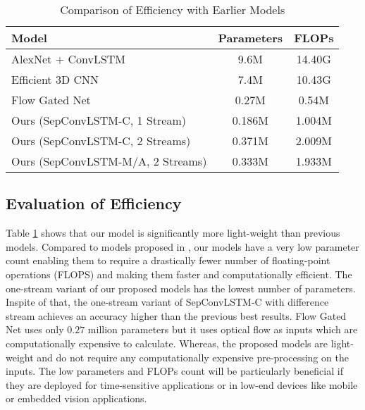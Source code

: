 \documentclass[conference]{IEEEtran}
\begin{document}
\begin{table}[t]
\caption{Comparison of Efficiency with Earlier Models}
\begin{center}
\begin{tabular}{lcc}
\hline
\textbf{Model}                & \textbf{Parameters} & \textbf{FLOPs} \\ \hline
AlexNet + ConvLSTM \cite{sudhakaran2017learning}                       & 9.6M           & 14.40G     \\
Efficient 3D CNN \cite{li2019efficient}               & 7.4M           & 10.43G    \\
Flow Gated Net \cite{cheng2019rwf}                & 0.27M           & 0.54M   \\
Ours (SepConvLSTM-C, 1 Stream)  & 0.186M        &  1.004M         \\
Ours (SepConvLSTM-C, 2 Streams) & 0.371M     &  2.009M              \\ 
Ours (SepConvLSTM-M/A, 2 Streams) & 0.333M     &  1.933M               \\ \hline
\end{tabular}
\end{center}
\label{table:efficiency}
\end{table}



\subsection{Evaluation of Efficiency}

Table \ref{table:efficiency} shows that our model is significantly more light-weight than previous models. Compared to models proposed in \cite{sudhakaran2017learning} \cite{li2019efficient}, our models have a very low parameter count enabling them to require a drastically fewer number of floating-point operations (FLOPS) and making them faster and computationally efficient. The one-stream variant of our proposed models has the lowest number of parameters. Inspite of that, the one-stream variant of SepConvLSTM-C with difference stream achieves an accuracy higher than the previous best results. Flow Gated Net \cite{cheng2019rwf} uses only \(0.27\) million parameters but it uses optical flow as inputs which are computationally expensive to calculate. Whereas, the proposed models are light-weight and do not require any computationally expensive pre-processing on the inputs. The low parameters and FLOPs count will be particularly beneficial if they are deployed for time-sensitive applications or in low-end devices like mobile or embedded vision applications. 
\end{document}
